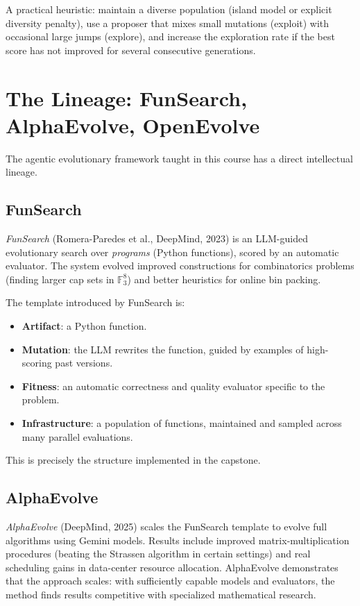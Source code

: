 A practical heuristic: maintain a diverse population (island model or explicit diversity penalty), use a proposer that mixes small mutations (exploit) with occasional large jumps (explore), and increase the exploration rate if the best score has not improved for several consecutive generations.

\section{The Lineage: FunSearch, AlphaEvolve, OpenEvolve}
\label{section:Lineage}

The agentic evolutionary framework taught in this course has a direct intellectual lineage.

\subsection{FunSearch}

\emph{FunSearch} (Romera-Paredes et al., DeepMind, 2023) is an LLM-guided evolutionary search over \emph{programs} (Python functions), scored by an automatic evaluator.
The system evolved improved constructions for combinatorics problems (finding larger cap sets in $\mathbb{F}_3^8$) and better heuristics for online bin packing.

The template introduced by FunSearch is:
\begin{itemize}
\item \textbf{Artifact}: a Python function.
\item \textbf{Mutation}: the LLM rewrites the function, guided by examples of high-scoring past versions.
\item \textbf{Fitness}: an automatic correctness and quality evaluator specific to the problem.
\item \textbf{Infrastructure}: a population of functions, maintained and sampled across many parallel evaluations.
\end{itemize}
This is precisely the structure implemented in the capstone.

\subsection{AlphaEvolve}

\emph{AlphaEvolve} (DeepMind, 2025) scales the FunSearch template to evolve full algorithms using Gemini models.
Results include improved matrix-multiplication procedures (beating the Strassen algorithm in certain settings) and real scheduling gains in data-center resource allocation.
AlphaEvolve demonstrates that the approach scales: with sufficiently capable models and evaluators, the method finds results competitive with specialized mathematical research.

